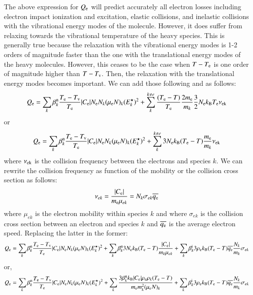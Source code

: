 \documentclass{warpdoc}
\begin{document}
The above expression for $Q_{\rm e}$ will predict accurately all electron losses including electron impact ionization and excitation, elastic collisions, and inelastic collisions with the vibrational energy modes of the molecule. However, it does suffer from relaxing towards the vibrational temperature of the heavy species. This is generally true because the relaxation with the vibrational energy modes is 1-2 orders of magnitude faster than the one with the translational energy modes of the heavy molecules. However, this ceases to be the case when $T-T_{\rm e}$ is one order of magnitude higher than $T-T_{\rm v}$. Then, the relaxation with the translational energy modes becomes important. We can add those following \cite[page 16]{book:1991:raizer} and
 \cite{jfm:1964:appleton} as follows:
%
\begin{equation}
Q_{\rm e}
= 
   \sum_k \beta_k^{\rm n} \frac{T_{\rm e}-T_{\rm v}}{T_{\rm e}} |C_{\rm e}| N_{\rm e} N_k (\mu_{\rm e}  N)_k  (E^\star_k)^2
 + \sum_k^{k \ne e}  \frac{(T_{\rm e}-T)}{T_{\rm e}} \frac{2 m_{\rm e}}{m_k} \frac{3}{2} N_{\rm e} k_{\rm B} T_{\rm e} \nu_{\rm ek}  
\end{equation}
%
or
%
\begin{equation}
Q_{\rm e}
= 
   \sum_k \beta_k^{\rm n} \frac{T_{\rm e}-T_{\rm v}}{T_{\rm e}} |C_{\rm e}| N_{\rm e} N_k (\mu_{\rm e}  N)_k  (E^\star_k)^2
 + \sum_k^{k\ne e}  3 N_{\rm e} k_{\rm B} (T_{\rm e}-T) \frac{ m_{\rm e}}{m_k}   \nu_{\rm ek}  
\end{equation}
%
where $\nu_{\rm ek}$ is the collision frequency between the electrons and species $k$. 
We can rewrite the collision frequency as function of the mobility \cite[page 9]{book:1991:raizer} or the collision cross section as follows:
%
\begin{equation}
\nu_{ek} = \frac{|C_{\rm e}|}{m_{\rm e} \mu_{ek}} = N_k \sigma_{ek} \overline{q_{\rm e}} 
\end{equation}
%
where $\mu_{ek}$ is the electron mobility within species $k$ and where  $\sigma_{ek}$ is the collision cross section between an electron and species $k$ and $\overline{q_{\rm e}}$ is the average electron speed. Replacing the latter in the former:
%
\begin{equation}
Q_{\rm e}
= 
   \sum_k \beta_k^{\rm n} \frac{T_{\rm e}-T_{\rm v}}{T_{\rm e}} |C_{\rm e}| N_{\rm e} N_k (\mu_{\rm e}  N)_k  (E^\star_k)^2
 + \sum_k \beta_k^{\rm n} 3 N_{\rm e} k_{\rm B} (T_{\rm e}-T)    \frac{|C_{\rm e}|}{m_k \mu_{ek}}  
 + \sum_k \beta_k^{\rm i} 3 \rho_{\rm e} k_{\rm B} (T_{\rm e}-T) \overline{q_{\rm e}} \frac{N_k}{m_k} \sigma_{ek} 
\end{equation}
%
or,
%
\begin{equation}
Q_{\rm e}
= 
   \sum_k \beta_k^{\rm n} \frac{T_{\rm e}-T_{\rm v}}{T_{\rm e}} |C_{\rm e}| N_{\rm e} N_k (\mu_{\rm e}  N)_k  (E^\star_k)^2
 + \sum_k  \frac{3 \beta_k^{\rm n} k_{\rm B} |C_{\rm e}| \rho_{\rm e} \rho_k  (T_{\rm e}-T)}{m_{\rm e} m_k^2 (\mu_{\rm e}N)_k}        
 + \sum_k \beta_k^{\rm i} 3 \rho_{\rm e} k_{\rm B} (T_{\rm e}-T) \overline{q_{\rm e}} \frac{N_k}{m_k} \sigma_{ek} 
\end{equation}
%
\end{document}

